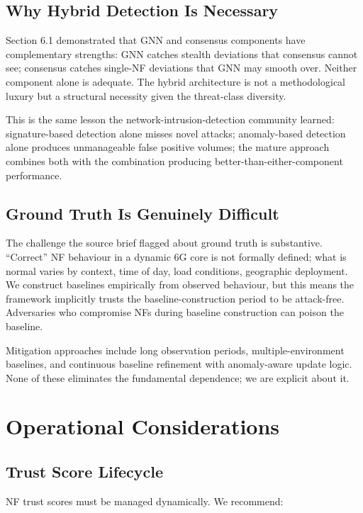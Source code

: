 \documentclass[sigconf,nonacm]{acmart}
\begin{document}
\subsection{Why Hybrid Detection Is Necessary}

Section 6.1 demonstrated that GNN and consensus components have
complementary strengths: GNN catches stealth deviations that
consensus cannot see; consensus catches single-NF deviations that
GNN may smooth over. Neither component alone is adequate. The
hybrid architecture is not a methodological luxury but a
structural necessity given the threat-class diversity.

This is the same lesson the network-intrusion-detection community
learned: signature-based detection alone misses novel attacks;
anomaly-based detection alone produces unmanageable false positive
volumes; the mature approach combines both with the combination
producing better-than-either-component performance.

\subsection{Ground Truth Is Genuinely Difficult}

The challenge the source brief flagged about ground truth is
substantive. ``Correct'' NF behaviour in a dynamic 6G core is not
formally defined; what is normal varies by context, time of day,
load conditions, geographic deployment. We construct baselines
empirically from observed behaviour, but this means the framework
implicitly trusts the baseline-construction period to be
attack-free. Adversaries who compromise NFs during baseline
construction can poison the baseline.

Mitigation approaches include long observation periods,
multiple-environment baselines, and continuous baseline refinement
with anomaly-aware update logic. None of these eliminates the
fundamental dependence; we are explicit about it.

\section{Operational Considerations}

\subsection{Trust Score Lifecycle}

NF trust scores must be managed dynamically. We recommend:
\end{document}
